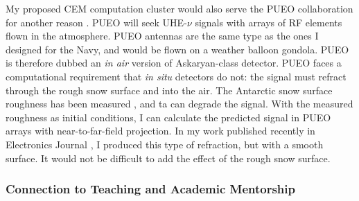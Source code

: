 \documentclass[../../../main.tex]{subfiles}
\begin{document}
My proposed CEM computation cluster would also serve the PUEO collaboration for another reason \cite{pueo}.  PUEO will seek UHE-$\nu$ signals with arrays of RF elements flown in the atmosphere.  PUEO antennas are the same type as the ones I designed for the Navy, and would be flown on a weather balloon gondola.  PUEO is therefore dubbed an \textit{in air} version of Askaryan-class detector.  PUEO faces a computational requirement that \textit{in situ} detectors do not: the signal must refract through the rough snow surface and into the air.  The Antarctic snow surface roughness has been measured \cite{doi:10.1142/S2251171717400025}, and ta can degrade the signal.  With the measured roughness as initial conditions, I can calculate the predicted signal in PUEO arrays with near-to-far-field projection.  In my work published recently in Electronics Journal \cite{electronics10040415}, I produced this type of refraction, but with a smooth surface.  It would not be difficult to add the effect of the rough snow surface.

\subsubsection{Connection to Teaching and Academic Mentorship}
\end{document}
